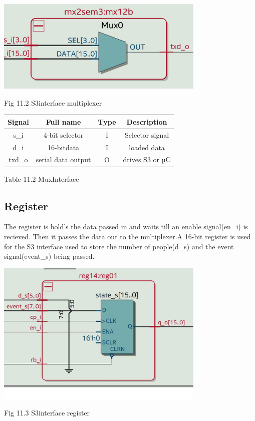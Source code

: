 \documentclass{article}
\begin{document}
\vspace{1 cm}
\begin{center}

\includegraphics[width=10cm]{muxinterface.JPG}
\end{center}
Fig 11.2 S3interface multiplexer
\vspace{1 cm}
 \begin{center}
           \begin{tabular}{|c|c|c|c|}
        \hline 
        Signal  &  Full name & Type & Description \\
        \hline
        \hline
        s\_i & 4-bit selector & I &  Selector signal \\ 
        \hline
        d\_i &  16-bitdata  & I & loaded data \\
        \hline 
        txd\_o &   serial data output & O & drives S3 or µC\\
        \hline 
          \end{tabular}
\end{center}
Table 11.2 MuxInterface


\newpage
\subsection{Register}

The register is hold's the data passed in and waits till an enable signal(en\_i) is recieved. Then it passes the data out to the multiplexer.A 16-bit register is used for the S3 interface used to store the number of people(d\_s) and the event signal(event\_s) being passed.

\vspace{1 cm}
\begin{center}

\includegraphics[width=10cm]{regs3.JPG}
\end{center}
Fig 11.3 S3interface register
\end{document}
